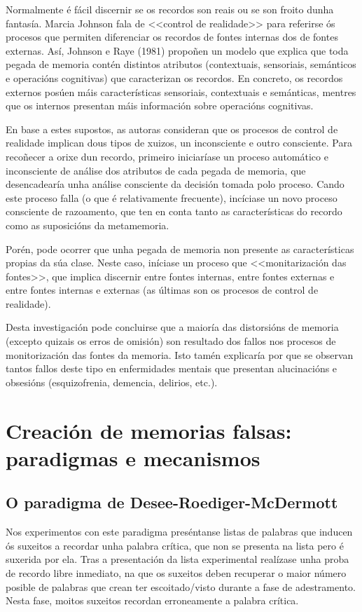 \documentclass[a4paper,11pt]{article}
\begin{document}
Normalmente é fácil discernir se os recordos son reais ou se son froito dunha fantasía. Marcia Johnson fala de <<control de realidade>> para referirse ós procesos que permiten diferenciar os recordos de fontes internas dos de fontes externas. Así, Johnson e Raye (1981) propoñen un modelo que explica que toda pegada de memoria contén distintos atributos (contextuais, sensoriais, semánticos e operacións cognitivas) que caracterizan os recordos. En concreto, os recordos externos posúen máis características sensoriais, contextuais e semánticas, mentres que os internos presentan máis información sobre operacións cognitivas. 

En base a estes supostos, as autoras consideran que os procesos de control de realidade implican dous tipos de xuizos, un inconsciente e outro consciente. Para recoñecer a orixe dun recordo, primeiro iniciaríase un proceso automático e inconsciente de análise dos atributos de cada pegada de memoria, que desencadearía unha análise consciente da decisión tomada polo proceso. Cando este proceso falla (o que é relativamente frecuente), incíciase un novo proceso consciente de razoamento, que ten en conta tanto as características do recordo como as suposicións da metamemoria. 

Porén, pode ocorrer que unha pegada de memoria non presente as características propias da súa clase. Neste caso, iníciase un proceso que <<monitarización das fontes>>, que implica discernir entre fontes internas, entre fontes externas e entre fontes internas e externas (as últimas son os procesos de control de realidade).

Desta investigación pode concluirse que a maioría das distorsións de memoria (excepto quizais os erros de omisión) son resultado dos fallos nos procesos de monitorización das fontes da memoria. Isto tamén explicaría por que se observan tantos fallos deste tipo en enfermidades mentais que presentan alucinacións e obsesións (esquizofrenia, demencia, delirios, etc.).

\section{Creación de memorias falsas: paradigmas e mecanismos}
\subsection{O paradigma de Desee-Roediger-McDermott}
Nos experimentos con este paradigma preséntanse listas de palabras que inducen ós suxeitos a recordar unha palabra crítica, que non se presenta na lista pero é suxerida por ela. Tras a presentación da lista experimental realízase unha proba de recordo libre inmediato, na que os suxeitos deben recuperar o maior número posible de palabras que crean ter escoitado/visto durante a fase de adestramento. Nesta fase, moitos suxeitos recordan erroneamente a palabra crítica.
\end{document}
